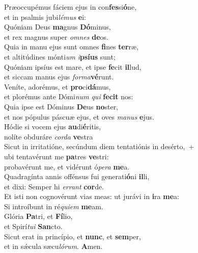 \evenverse Præoccupémus fáciem ejus in con\textbf{fes}si\textbf{ó}ne,~\*\\
\evenverse et in psalmis jubi\textit{lé}\textit{mus} \textbf{e}i:\\
\oddverse Quóniam Deus \textbf{ma}gnus \textbf{Dó}minus,~\*\\
\oddverse et rex magnus super \textit{om}\textit{nes} \textbf{de}os.\\
\evenverse Quia in manu ejus sunt omnes \textbf{fi}nes \textbf{ter}ræ,~\*\\
\evenverse et altitúdines mónti\textit{um} \textit{i}\textbf{psí}\textbf{us} sunt;\\
\oddverse Quóniam ipsíus est mare, et ipse \textbf{fe}cit \textbf{il}lud,~\*\\
\oddverse et siccam manus ejus \textit{for}\textit{ma}\textbf{vé}runt.\\
\evenverse Veníte, adorémus, et \textbf{pro}ci\textbf{dá}mus,~\*\\
\evenverse et plorémus ante Dómi\textit{num} \textit{qui} \textbf{fe}\textbf{cit} nos:\\
\oddverse Quia ipse est Dóminus \textbf{De}us \textbf{no}ster,~\*\\
\oddverse et nos pópulus páscuæ ejus, et oves \textit{ma}\textit{nus} \textbf{e}jus.\\
\evenverse Hódie si vocem ejus \textbf{au}di\textbf{é}ritis,~\*\\
\evenverse nolíte obduráre \textit{cor}\textit{da} \textbf{ve}stra\\
\oddverse Sicut in irritatióne, secúndum diem tentatiónis in desérto,~+\\
\oddverse  ubi tentavérunt me \textbf{pa}tres \textbf{ve}stri:~\*\\
\oddverse probavérunt me, et vidérunt ó\textit{pe}\textit{ra} \textbf{me}a.\\
\evenverse Quadragínta annis offénsus fui generati\textbf{ó}ni \textbf{il}li,~\*\\
\evenverse et dixi: Semper hi \textit{er}\textit{rant} \textbf{cor}de.\\
\oddverse Et isti non cognovérunt vias meas: ut jurávi in \textbf{i}ra \textbf{me}a:~\*\\
\oddverse Si introíbunt in ré\textit{qui}\textit{em} \textbf{me}am.\\
\evenverse Glória \textbf{Pa}tri, et \textbf{Fí}lio,~\*\\
\evenverse et Spirí\textit{tu}\textit{i} \textbf{San}cto.\\
\oddverse Sicut erat in princípio, et \textbf{nunc}, et \textbf{sem}per,~\*\\
\oddverse et in sǽcula sæcu\textit{ló}\textit{rum}. \textbf{A}men.\\
